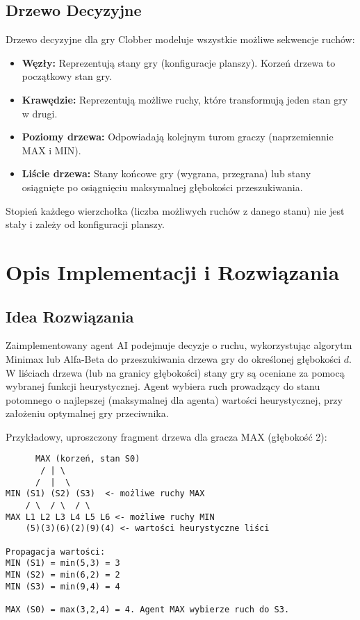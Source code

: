 \documentclass[12pt,a4paper]{article}
\begin{document}
\subsection{Drzewo Decyzyjne}
Drzewo decyzyjne dla gry Clobber modeluje wszystkie możliwe sekwencje ruchów:
\begin{itemize}
    \item \textbf{Węzły:} Reprezentują stany gry (konfiguracje planszy). Korzeń drzewa to początkowy stan gry.
    \item \textbf{Krawędzie:} Reprezentują możliwe ruchy, które transformują jeden stan gry w drugi.
    \item \textbf{Poziomy drzewa:} Odpowiadają kolejnym turom graczy (naprzemiennie MAX i MIN).
    \item \textbf{Liście drzewa:} Stany końcowe gry (wygrana, przegrana) lub stany osiągnięte po osiągnięciu maksymalnej głębokości przeszukiwania.
\end{itemize}
Stopień każdego wierzchołka (liczba możliwych ruchów z danego stanu) nie jest stały i zależy od konfiguracji planszy.

\section{Opis Implementacji i Rozwiązania}
\subsection{Idea Rozwiązania}
Zaimplementowany agent AI podejmuje decyzje o ruchu, wykorzystując algorytm Minimax lub Alfa-Beta do przeszukiwania drzewa gry do określonej głębokości $d$. W liściach drzewa (lub na granicy głębokości) stany gry są oceniane za pomocą wybranej funkcji heurystycznej. Agent wybiera ruch prowadzący do stanu potomnego o najlepszej (maksymalnej dla agenta) wartości heurystycznej, przy założeniu optymalnej gry przeciwnika.

Przykładowy, uproszczony fragment drzewa dla gracza MAX (głębokość 2):
\begin{verbatim}
      MAX (korzeń, stan S0)
       / | \
      /  |  \
MIN (S1) (S2) (S3)  <- możliwe ruchy MAX
    / \  / \  / \
MAX L1 L2 L3 L4 L5 L6 <- możliwe ruchy MIN
    (5)(3)(6)(2)(9)(4) <- wartości heurystyczne liści

Propagacja wartości:
MIN (S1) = min(5,3) = 3
MIN (S2) = min(6,2) = 2
MIN (S3) = min(9,4) = 4

MAX (S0) = max(3,2,4) = 4. Agent MAX wybierze ruch do S3.
\end{verbatim}
\end{document}
